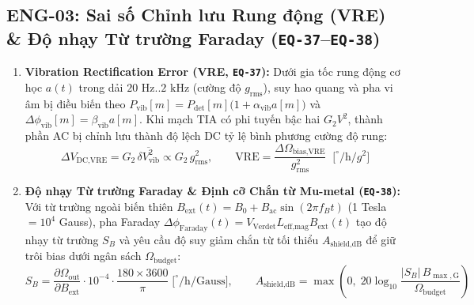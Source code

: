 \documentclass[11pt, a4paper]{article}
\begin{document}
\subsection{ENG-03: Sai số Chỉnh lưu Rung động (VRE) \& Độ nhạy Từ trường Faraday (\texttt{EQ-37}--\texttt{EQ-38})}
\begin{enumerate}
    \item \textbf{Vibration Rectification Error (VRE, \texttt{EQ-37}):} Dưới gia tốc rung động cơ học $a(t)$ trong dải $20\text{ Hz}..2\text{ kHz}$ (cường độ $g_{\text{rms}}$), suy hao quang và pha vi âm bị điều biến theo $P_{\text{vib}}[m] = P_{\text{det}}[m]\bigl(1 + \alpha_{\text{vib}} a[m]\bigr)$ và $\Delta\phi_{\text{vib}}[m] = \beta_{\text{vib}} a[m]$. Khi mạch TIA có phi tuyến bậc hai $G_2 V^2$, thành phần AC bị chỉnh lưu thành độ lệch DC tỷ lệ bình phương cường độ rung:
    \begin{equation}
    \Delta V_{\text{DC,VRE}} = G_2\,\overline{\delta V_{\text{vib}}^2} \propto G_2\,g_{\text{rms}}^2, \qquad
    \mathrm{VRE} = \frac{\Delta\Omega_{\text{bias,VRE}}}{g_{\text{rms}}^2} \;\; \bigl[^\circ/\text{h}/g^2\bigr]
    \label{eq:eq37_vre}
    \end{equation}
    \item \textbf{Độ nhạy Từ trường Faraday \& Định cỡ Chắn từ Mu-metal (\texttt{EQ-38}):} Với từ trường ngoài biến thiên $B_{\text{ext}}(t) = B_0 + B_{\text{ac}}\sin(2\pi f_B t)$ (1 Tesla $= 10^4$ Gauss), pha Faraday $\Delta\phi_{\text{Faraday}}(t) = V_{\text{Verdet}} L_{\text{eff,mag}} B_{\text{ext}}(t)$ tạo độ nhạy từ trường $S_B$ và yêu cầu độ suy giảm chắn từ tối thiểu $A_{\text{shield,dB}}$ để giữ trôi bias dưới ngân sách $\Omega_{\text{budget}}$:
    \begin{equation}
    S_B = \frac{\partial\Omega_{\text{out}}}{\partial B_{\text{ext}}}\cdot 10^{-4}\cdot \frac{180\times 3600}{\pi} \;\bigl[^\circ/\text{h}/\text{Gauss}\bigr], \qquad
    A_{\text{shield,dB}} = \max\!\left(0,\; 20\log_{10}\!\frac{|S_B|\,B_{\max,\text{G}}}{\Omega_{\text{budget}}}\right)
    \label{eq:eq38_faraday}
    \end{equation}
\end{enumerate}
\end{document}

